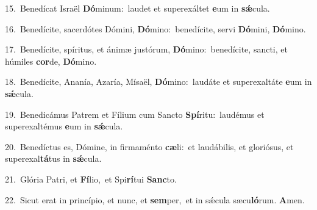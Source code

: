 {\numbfont\textcolor{\numbcolor}{15.}}~Benedícat Israël \textbf{Dó}\-minum:~\star laudet et superexáltet \textbf{e}\-um in \textbf{sǽ}\-cula.\par
{\numbfont\textcolor{\numbcolor}{16.}}~Benedícite, sacerdótes Dómini, \textbf{Dó}\-mino:~\star benedícite, servi \textbf{Dó}\-mini, \textbf{Dó}\-mino.\par
{\numbfont\textcolor{\numbcolor}{17.}}~Benedícite, spíritus, et ánimæ justórum, \textbf{Dó}\-mino:~\star benedícite, sancti, et húmiles \textbf{cor}\-de, \textbf{Dó}\-mino.\par
{\numbfont\textcolor{\numbcolor}{18.}}~Benedícite, Ananía, Azaría, Mísaël, \textbf{Dó}\-mino:~\star laudáte et superexaltáte \textbf{e}\-um in \textbf{sǽ}\-cula.\par
{\numbfont\textcolor{\numbcolor}{19.}}~Benedicámus Patrem et Fílium cum Sancto \textbf{Spí}\-ritu:~\star laudémus et superexaltémus \textbf{e}\-um in \textbf{sǽ}\-cula.\par
{\numbfont\textcolor{\numbcolor}{20.}}~Benedíctus es, Dómine, in firmaménto \textbf{cæ}\-li:~\star et laudábilis, et gloriósus, et superexal\-\textbf{tá}\-tus in \textbf{sǽ}\-cula.\par
{\numbfont\textcolor{\numbcolor}{21.}}~Glória Patri, et \textbf{Fí}\-lio,~\star et Spi\-\textbf{rí}\-tui \textbf{Sanc}\-to.\par
{\numbfont\textcolor{\numbcolor}{22.}}~Sicut erat in princípio, et nunc, et \textbf{sem}\-per,~\star et in sǽcula sæcu\-\textbf{ló}\-rum. \textbf{A}\-men.\par
